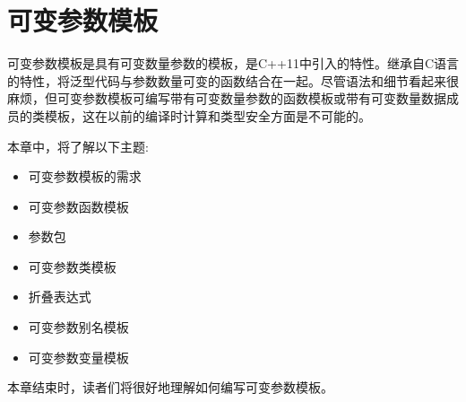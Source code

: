 \chapter{可变参数模板}
可变参数模板是具有可变数量参数的模板，是C++11中引入的特性。继承自C语言的特性，将泛型代码与参数数量可变的函数结合在一起。尽管语法和细节看起来很麻烦，但可变参数模板可编写带有可变数量参数的函数模板或带有可变数量数据成员的类模板，这在以前的编译时计算和类型安全方面是不可能的。

本章中，将了解以下主题:

\begin{itemize}
  \item 可变参数模板的需求
  \item 可变参数函数模板
  \item 参数包
  \item 可变参数类模板
  \item 折叠表达式
  \item 可变参数别名模板
  \item 可变参数变量模板
\end{itemize}

本章结束时，读者们将很好地理解如何编写可变参数模板。










